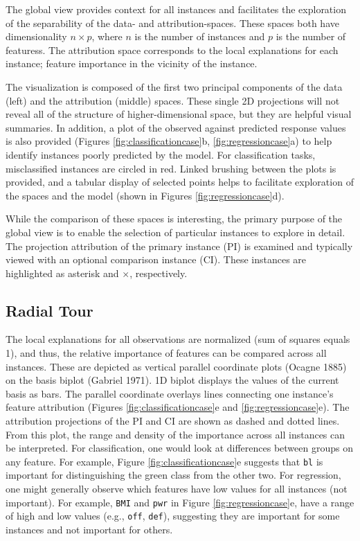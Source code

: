 \documentclass[11pt,twoside]{article}
\begin{document}
The global view provides context for all instances and facilitates the exploration of the separability of the data- and attribution-spaces. These spaces both have dimensionality \(n \times p\), where \(n\) is the number of instances and \(p\) is the number of featuress. The attribution space corresponds to the local explanations for each instance; feature importance in the vicinity of the instance.

The visualization is composed of the first two principal components of the data (left) and the attribution (middle) spaces. These single 2D projections will not reveal all of the structure of higher-dimensional space, but they are helpful visual summaries. In addition, a plot of the observed against predicted response values is also provided (Figures \ref{fig:classificationcase}b, \ref{fig:regressioncase}a) to help identify instances poorly predicted by the model. For classification tasks, misclassified instances are circled in red. Linked brushing between the plots is provided, and a tabular display of selected points helps to facilitate exploration of the spaces and the model (shown in Figures \ref{fig:regressioncase}d).

While the comparison of these spaces is interesting, the primary purpose of the global view is to enable the selection of particular instances to explore in detail. The projection attribution of the primary instance (PI) is examined and typically viewed with an optional comparison instance (CI). These instances are highlighted as asterisk and \(\times\), respectively.

\hypertarget{radial-tour}{%
\subsection{Radial Tour}\label{radial-tour}}

The local explanations for all observations are normalized (sum of squares equals 1), and thus, the relative importance of features can be compared across all instances. These are depicted as vertical parallel coordinate plots (Ocagne 1885) on the basis biplot (Gabriel 1971). 1D biplot displays the values of the current basis as bars. The parallel coordinate overlays lines connecting one instance's feature attribution (Figures \ref{fig:classificationcase}e and \ref{fig:regressioncase}e). The attribution projections of the PI and CI are shown as dashed and dotted lines. From this plot, the range and density of the importance across all instances can be interpreted. For classification, one would look at differences between groups on any feature. For example, Figure \ref{fig:classificationcase}e suggests that \texttt{bl} is important for distinguishing the green class from the other two. For regression, one might generally observe which features have low values for all instances (not important). For example, \texttt{BMI} and \texttt{pwr} in Figure \ref{fig:regressioncase}e, have a range of high and low values (e.g., \texttt{off}, \texttt{def}), suggesting they are important for some instances and not important for others.
\end{document}
